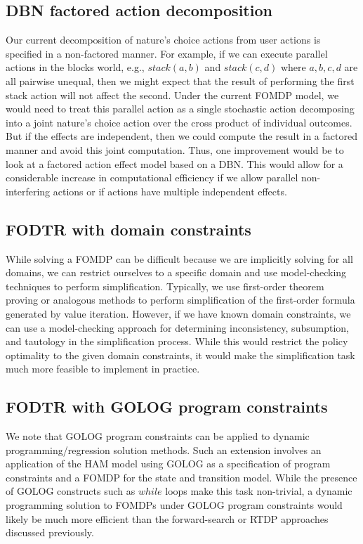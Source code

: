 \subsection{DBN factored action decomposition}

Our current decomposition of nature's choice actions from user actions
is specified in a non-factored manner.  For example, if we can execute
parallel actions in the blocks world, e.g., $stack(a,b)$ and $stack(c,d)$
where $a,b,c,d$ are all pairwise unequal, then we might expect that
the result of performing the first stack action will not affect the second.
Under the current FOMDP model, we would need to treat this parallel
action as a single stochastic action decomposing into a joint nature's
choice action over the cross product of individual outcomes.  But if
the effects are independent, then we could compute the result in
a factored manner and avoid this joint computation.  Thus, one
improvement would be to look at a factored action effect model based
on a DBN.  This would allow for a considerable increase in
computational efficiency if we allow parallel non-interfering actions or
if actions have multiple independent effects.

\subsection{FODTR with domain constraints}

While solving a FOMDP can be difficult because we are implicitly
solving for all domains, we can restrict ourselves to a specific
domain and use model-checking techniques to perform simplification.
Typically, we use first-order theorem proving or analogous methods to
perform simplification of the first-order formula generated by value
iteration.  However, if we have known domain constraints, we can use a
model-checking approach for determining inconsistency, subsumption,
and tautology in the simplification process.  While this would
restrict the policy optimality to the given domain
constraints, it would make the simplification task much more 
feasible to implement in practice.

\subsection{FODTR with GOLOG program constraints}

We note that GOLOG program constraints can be applied to dynamic
programming/regression solution methods.  Such an extension 
involves an application of the HAM model using GOLOG as a
specification of program
constraints and a FOMDP for the state and transition model.
While the presence of GOLOG constructs such as $while$ loops
make this task non-trivial, a dynamic programming solution to
FOMDPs under GOLOG program constraints would likely be much
more efficient than the forward-search or RTDP approaches discussed previously.

